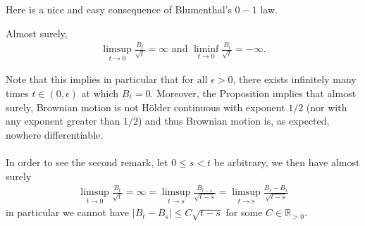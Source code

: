 \documentclass[../mainfile.tex]{subfiles}
\begin{document}
Here is a nice and easy consequence of Blumenthal's $0-1$ law. 
\begin{prop} Almost surely,
\begin{align*}
\limsup_{t \to 0 } \frac{B_t}{\sqrt{t}} = \infty \text{ and } \liminf_{t \to 0} \frac{B_t}{\sqrt{t}}= - \infty. 
\end{align*}
\end{prop}
\begin{rem} Note that this implies in particular that for all $\epsilon >0$, there exists infinitely many times $t \in (0 , \epsilon)$ at which $B_t=0$. Moreover, the Proposition implies that almost surely, Brownian motion is not Hölder continuous with exponent $1/2$ (nor with any exponent greater than $1/2$) and thus Brownian motion is, as expected, nowhere differentiable.
\\\\
In order to see the second remark, let $0 \leq s < t$ be arbitrary, we then have almost surely
\begin{align*}
\limsup_{t \to 0} \frac{B_t}{\sqrt{t}}=\infty = \limsup_{t \to s} \frac{B_{t-s}}{\sqrt{t-s}} =  \limsup_{t \to s} \frac{B_t-B_s}{\sqrt{t-s}}
\end{align*}
in particular we cannot have $|B_t-B_s| \leq C\sqrt{t-s}$ for some $C \in \mathbb{R}_{>0}$.
\end{rem}
\newpage
\end{document}
